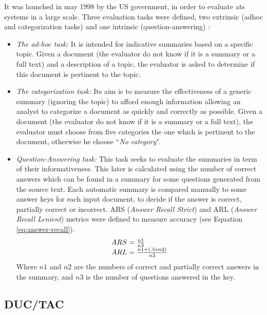It was launched in may 1998 by the US government, in order to evaluate \ac{ats} systems in a large scale.
Three evaluation tasks were defined, two extrinsic (adhoc and categorization tasks) and one intrinsic (question-answering) \citep{99-mani-al}:
\begin{itemize}
	
	\item \textit{The ad-hoc task:} It is intended for indicative summaries based on a specific topic. 
	Given a document (the evaluator do not know if it is a summary or a full text) and a description of a topic, the evaluator is asked to determine if this document is pertinent to the topic. 
	
	\item \textit{The categorization task:} Its aim is to measure the effectiveness of a generic summary (ignoring the topic) to afford enough information allowing an analyst to categorize a document as quickly and correctly as possible. 
	Given a document (the evaluator do not know if it is a summary or a full text), the evaluator must choose from five categories the one which is pertinent to the document, otherwise he choose ``\textit{No category}".
	
	\item \textit{Question-Answering task:} This task seeks to evaluate the summaries in term of their informativeness. 
	This later is calculated using the number of correct answers which can be found in a summary for some questions generated from the source text.
	Each automatic summary is compared manually to some answer keys for each input document, to decide if the answer is correct, partially correct or incorrect. 
	ARS (\textit{Answer Recall Strict}) and ARL (\textit{Answer Recall Lenient}) metrics were defined to measure accuracy (see Equation \ref{eq:answer-recall}).
	\begin{equation}
		\label{eq:answer-recall}
		\begin{tabular}{l}
		$ ARS = \frac{n1}{n3} $ \\
		$ ARL = \frac{n1 + (.5 * n2)}{n3} $
		\end{tabular}
	\end{equation}
	Where $ n1 $ and $ n2 $ are the numbers of correct and partially correct answers in the summary, and $ n3 $ is the number of questions answered in the key. 
\end{itemize}

\subsection{DUC/TAC}
\label{sssec:eval-duc}

